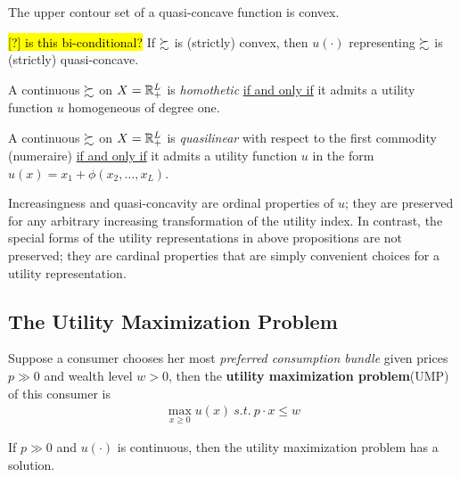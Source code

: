 \documentclass{report}
\begin{document}
 			\begin{lemma}
 				The upper contour set of a quasi-concave function is convex.
 			\end{lemma}
 			
 			\begin{proposition}
 				\hl{[?] is this bi-conditional?}
 				If $\succsim$ is (strictly) convex, then $u(\cdot)$ representing $\succsim$ is (strictly) quasi-concave.
 			\end{proposition}
 			
 			\begin{proposition}
 				A continuous $\succsim$ on $X = \mathbb{R}^L_+$ is \emph{homothetic} \ul{if and only if} it admits a utility function $u$ homogeneous of degree one.
 			\end{proposition}
 			
 			\begin{proposition}
 				A continuous $\succsim$ on $X = \mathbb{R}^L_+$ is \emph{quasilinear} with respect to the first commodity (numeraire) \ul{if and only if} it admits a utility function $u$ in the form $u(x) = x_1 + \phi(x_2, \dots, x_L)$.
 			\end{proposition}
 			
 			\begin{remark}
 				Increasingness and quasi-concavity are ordinal properties of $u$; they are preserved for any arbitrary increasing transformation of the utility index. In contrast, the special forms of the utility representations in above propositions are not preserved; they are cardinal properties that are simply convenient choices for a utility representation.
 			\end{remark}
 		
 		\subsection{The Utility Maximization Problem}
 			\begin{definition}
 				Suppose a consumer chooses her most \emph{preferred consumption bundle} given prices $p \gg 0$ and wealth level $w > 0$, then the \textbf{utility maximization problem}(UMP) of this consumer is
 				\begin{align}
 					\max_{x \geq 0} u(x)\ s.t.\ p \cdot x \leq w
 				\end{align}
 			\end{definition}
 			
 			\begin{proposition}[3.D.1]
 				If $p \gg 0$ and $u(\cdot)$ is continuous, then the utility maximization problem has a solution.
 			\end{proposition}
 			
\end{document}
